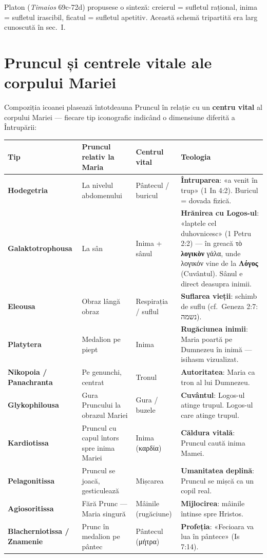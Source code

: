 \documentclass[12pt,a4paper,twoside,openany]{book}
\begin{document}
Platon (\textit{Timaios} 69c-72d) propusese o sinteză: creierul = sufletul rațional, inima = sufletul irascibil, ficatul = sufletul apetitiv. Această schemă tripartită era larg cunoscută în sec.\ I.

\section*{Pruncul și centrele vitale ale corpului Mariei}

Compoziția icoanei plasează întotdeauna Pruncul în relație cu un \textbf{centru vital} al corpului Mariei --- fiecare tip iconografic indicând o dimensiune diferită a Întrupării:

\begin{center}
\footnotesize
\begin{tabular}{L{2.5cm}L{2.5cm}L{2cm}L{5.5cm}}
\toprule
{}
\textbf{Tip} & \textbf{Pruncul relativ la Maria} & \textbf{Centrul vital} & \textbf{Teologia} \\
\midrule
\textbf{Hodegetria} & La nivelul abdomenului & Pântecul / buricul & \textbf{Întruparea}: «a venit în trup» (1 In 4:2). Buricul = dovada fizică. \\
\textbf{Galaktotrophousa} & La sân & Inima + sânul & \textbf{Hrănirea cu Logos-ul}: «laptele cel duhovnicesc» (1 Petru 2:2) --- în greacă τὸ \textbf{λογικὸν} γάλα, unde λογικόν vine de la \textbf{Λόγος} (Cuvântul). Sânul e direct deasupra inimii. \\
\textbf{Eleousa} & Obraz lângă obraz & Respirația / suflul & \textbf{Suflarea vieții}: schimb de suflu (cf.\ Geneza 2:7: נשמה). \\
\textbf{Platytera} & Medalion pe piept & Inima & \textbf{Rugăciunea inimii}: Maria poartă pe Dumnezeu în inimă --- isihasm vizualizat. \\
\textbf{Nikopoia / Panachranta} & Pe genunchi, centrat & Tronul & \textbf{Autoritatea}: Maria ca tron al lui Dumnezeu. \\
\textbf{Glykophilousa} & Gura Pruncului la obrazul Mariei & Gura / buzele & \textbf{Cuvântul}: Logos-ul atinge trupul. Logos-ul care atinge trupul. \\
\textbf{Kardiotissa} & Pruncul cu capul întors spre inima Mariei & Inima (καρδία) & \textbf{Căldura vitală}: Pruncul caută inima Mamei. \\
\textbf{Pelagonitissa} & Pruncul se joacă, gesticulează & Mișcarea & \textbf{Umanitatea deplină}: Pruncul se mișcă ca un copil real. \\
\textbf{Agiosoritissa} & Fără Prunc --- Maria singură & Mâinile (rugăciune) & \textbf{Mijlocirea}: mâinile întinse spre Hristos. \\
\textbf{Blacherniotissa / Znamenie} & Prunc în medalion pe pântec & Pântecul (μήτρα) & \textbf{Profeția}: «Fecioara va lua în pântece» (Is 7:14). \\
\bottomrule
\end{tabular}
\end{center}
\normalsize
\end{document}
